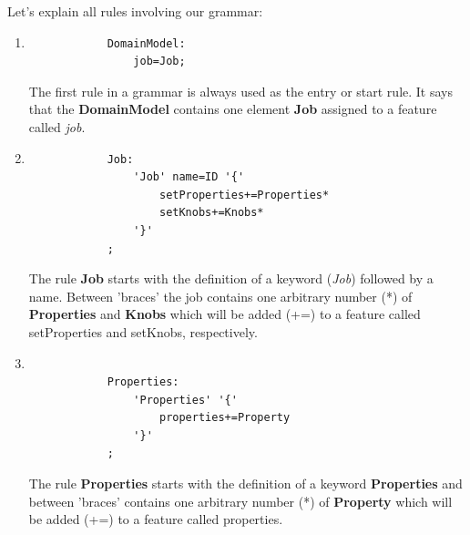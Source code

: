 Let's explain all rules involving our grammar:
\begin{enumerate}
	\item
		\singlespacing
		\begin{listing}[H]
		\begin{verbatim}
			DomainModel:
				job=Job;
		\end{verbatim}
		\label{listing:modelRule}
		\end{listing}

		The first rule in a grammar is always used as the entry or start rule.
		It says that the \textbf{DomainModel} contains one element \textbf{Job}
		assigned to a feature called \textit{job}.

	\item
		\singlespacing
		\begin{listing}[H]
		\begin{verbatim}
			Job:
				'Job' name=ID '{'
                    setProperties+=Properties*
					setKnobs+=Knobs*
				'}'
			;	
		\end{verbatim}
		\label{listing:modelRule}
		\end{listing}

		The rule \textbf{Job} starts with the definition of a keyword ({\it Job})
		followed by a name. Between 'braces' the job contains one arbitrary number
		(*) of \textbf{Properties} and \textbf{Knobs} which will be added (+=) to
        a feature called setProperties and setKnobs, respectively.

    \item
		\singlespacing
		\begin{listing}[H]
		\begin{verbatim}

            Properties:
                'Properties' '{'
                    properties+=Property
                '}'
            ;
		\end{verbatim}
		\label{listing:modelRule}
		\end{listing}

        The rule {\bf Properties} starts with the definition of a keyword {\bf Properties}
		and between 'braces' contains one arbitrary number (*) of \textbf{Property}
		which will be added (+=) to a feature called properties.


\end{enumerate}
